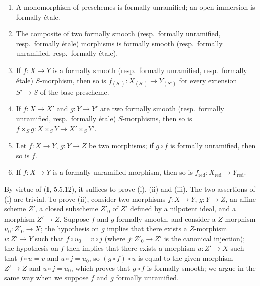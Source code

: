 \begin{remarks}[17.1.2]
\begin{enumerate}
\end{enumerate}
\end{remarks}

\begin{proposition}[17.1.3]
\label{IV.17.1.3}
\begin{enumerate}
  \item[\textup{(i)}] A monomorphism of preschemes is formally unramified; an open immersion is formally étale.
  \item[\textup{(ii)}] The composite of two formally smooth \textup{(resp.}\ formally unramified, \textup{resp.}\ formally étale\textup{)} morphisms is formally smooth \textup{(resp.}\ formally unramified, \textup{resp.}\ formally étale\textup{)}.
  \item[\textup{(iii)}] If $f:X\to Y$ is a formally smooth \textup{(resp.}\ formally unramified, \textup{resp.}\ formally étale\textup{)} $S$-morphism, then so is $f_{(S')}:X_{(S')}\to Y_{(S')}$ for every extension $S'\to S$ of the base prescheme.
  \item[\textup{(iv)}] If $f:X\to X'$ and $g:Y\to Y'$ are two formally smooth \textup{(resp.}\ formally unramified, \textup{resp.}\ formally étale\textup{)} $S$-morphisms, then so is $f\times_S g:X\times_S Y\to X'\times_S Y'$.
  \item[\textup{(v)}] Let $f:X\to Y$, $g:Y\to Z$ be two morphisms; if $g\circ f$ is formally unramified, then so is $f$.
  \item[\textup{(vi)}] If $f:X\to Y$ is a formally unramified morphism, then so is $f_{\mathrm{red}}:X_{\mathrm{red}}\to Y_{\mathrm{red}}$.
\end{enumerate}
\end{proposition}

By virtue of (\textbf{I}, 5.5.12), it suffices to prove (i), (ii) and (iii). The two assertions of (i) are trivial. To prove (ii), consider two morphisms $f:X\to Y$, $g:Y\to Z$, an affine scheme $Z'$, a closed subscheme $Z'_0$ of $Z'$ defined by a nilpotent ideal, and a morphism $Z'\to Z$. Suppose $f$ and $g$ formally smooth, and consider a
$Z$-morphism $u_0:Z'_0\to X$; the hypothesis on $g$ implies that there exists a $Z$-morphism $v:Z'\to Y$ such that $f\circ u_0=v\circ j$ (where $j:Z'_0\to Z'$ is the canonical injection); the hypothesis on $f$ then implies that there exists a morphism $u:Z'\to X$ such that $f\circ u=v$ and $u\circ j=u_0$, so $(g\circ f)\circ u$ is equal to the given morphism $Z'\to Z$ and $u\circ j=u_0$, which proves that $g\circ f$ is formally smooth; we argue in the same way when we suppose $f$ and $g$ formally unramified.

